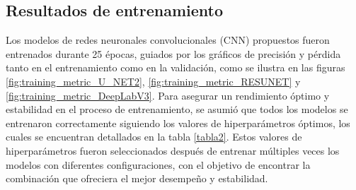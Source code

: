 \subsection{Resultados de entrenamiento}



Los modelos de redes neuronales convolucionales (CNN) propuestos fueron entrenados durante 25 épocas, guiados por los gráficos de precisión y pérdida tanto en el entrenamiento como en la validación, como se ilustra en las figuras \ref{fig:training_metric_U_NET2}, \ref{fig:training_metric_RESUNET} y \ref{fig:training_metric_DeepLabV3}. Para asegurar un rendimiento óptimo y estabilidad en el proceso de entrenamiento, se asumió que todos los modelos se entrenaron correctamente siguiendo los valores de hiperparámetros óptimos, los cuales se encuentran detallados en la tabla \ref{tabla2}. Estos valores de hiperparámetros fueron seleccionados después de entrenar múltiples veces los modelos con diferentes configuraciones, con el objetivo de encontrar la combinación que ofreciera el mejor desempeño y estabilidad.


